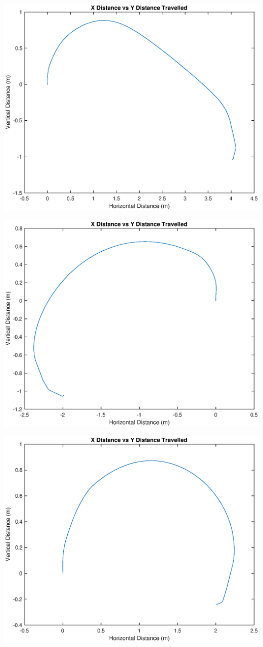 \documentclass[10pt]{article}
\newcommand{\bigScale}{0.6}
\begin{document}
\includegraphics[scale=\bigScale]{./figures/task1_x-1y4.eps}

\includegraphics[scale=\bigScale]{./figures/task1_x-1y-2.eps}

\includegraphics[scale=\bigScale]{./figures/task1_x0point2y2.eps}
\end{document}
